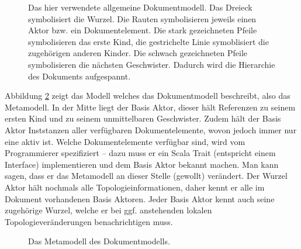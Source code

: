  
\begin{figure}[h!]
\centering
\advance\leftskip-2.5cm
\caption[Allgemeines Dokumentmodell]{ Das hier verwendete allgemeine Dokumentmodell. Das Dreieck symbolisiert die Wurzel. Die Rauten symbolisieren jeweils einen Aktor bzw. ein Dokumentelement. Die stark gezeichneten Pfeile symbolisieren das erste Kind, die gestrichelte Linie symoblisiert die zugehörigen anderen Kinder. Die schwach gezeichneten Pfeile symbolisieren die nächsten Geschwister. Dadurch wird die Hierarchie des Dokuments aufgespannt. }\label{docmodell}
\end{figure}
 
Abbildung \ref{metamodell} zeigt das Modell welches das Dokumentmodell beschreibt, also das Metamodell. In der Mitte liegt der Basis Aktor, dieser hält Referenzen zu seinem ersten Kind und zu seinem unmittelbaren Geschwister. Zudem hält der Basis Aktor Inststanzen aller verfügbaren Dokumentelemente, wovon jedoch immer nur eine aktiv ist. Welche Dokumentelemente verfügbar sind, wird vom Programmierer spezifiziert -- dazu muss er ein Scala Trait (entspricht einem Interface) implementieren und dem Basis Aktor bekannt machen. Man kann sagen, dass er das Metamodell an dieser Stelle (gewollt) verändert. Der Wurzel Aktor hält nochmals alle Topologieinformationen, daher kennt er alle im Dokument vorhandenen Basis Aktoren. Jeder Basis Aktor kennt auch seine zugehörige Wurzel, welche er bei ggf. anstehenden lokalen Topologieveränderungen benachrichtigen muss.

 
\begin{figure}[h!]
\centering
\advance\leftskip-2.5cm
\caption[Metamodell des Dokumentmodells]{ Das Metamodell des Dokumentmodells. }\label{metamodell}
\end{figure}
 
